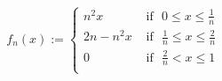 \documentclass[preview]{standalone}
\begin{document}
\begin{align*}
f_{n}(x) := \begin{cases}n^{2}x  &  \text{ if} \ \ \ 0 \leq x \leq \frac{1}{n} \\2n-n^{2}x &  \text{ if} \ \ \ \frac{1}{n} \leq x \leq \frac{2}{n} \\0 &  \text{ if} \ \ \ \frac{2}{n} < x \leq 1 \\\end{cases}
\end{align*}
\end{document}
